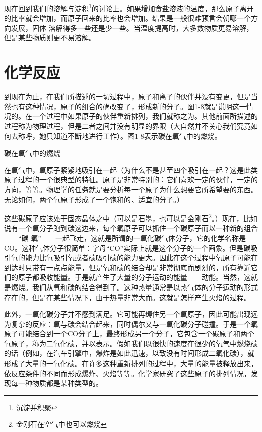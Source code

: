 \documentclass[12pt,oneside]{book}
\begin{document}
\begin{common-format}
现在回到我们的溶解与淀积\footnote{沉淀并积聚}的讨论上。如果增加食盐溶液的温度，那么原子离开的比率就会增加，而原子回来的比率也会增加。结果是一般很难预言会朝哪一个方向发展，固体
溶解得多一些还是少一些。当温度提高时，大多数物质更易溶解， 但是某些物质则更不易溶解。

\section{化学反应}
到现在为止，在我们所描述的一切过程中，原子和离子的伙伴并没有变更，但是当然也有这种情况，原子的组合的确改变了，形成新的分子。图1-8就是说明这一情况的。在一个过程中如果原子的伙伴重新排列，我们就称之为。其他前面所描述的过程称为物理过程，但是二者之间并没有明显的界限（大自然并不关心我们究竟如何去称呼，她只知道不断地进行工作）。图1-8表示碳在氧气中的燃烧。
\begin{fig}{碳在氧气中的燃烧}
\caption{碳在氧气中的燃烧}
\label{fig:碳在氧气中的燃烧}
\end{fig}
在氧气中，氧原子紧紧地吸引在一起（为什么不是甚至四个吸引在一起？这是此类原子过程的一个很典型的特征。原子是非常特别的：它们喜欢一定的伙伴，一定的方向，等等。物理学的任务就是要分析每一个原子为什么想要它所希望要的东西。无论如何，两个氧原子形成了一个饱和的、适宜的分子。）

这些碳原子应该处于固态晶体之中（可以是石墨，也可以是金刚石\footnote{金刚石在空气中也可以燃烧}。）现在，比如说有一个氧分子跑到碳这边来，每个氧原子可以抓住一个碳原子而以一种新的组合——“碳-氧”——一起飞走，这就是所谓的一氧化碳气体分子，它的化学名称是CO。这种气体分子很简单：字母“CO”实际上就是这个分子的一个画象。但是碳吸引氧的能力比氧吸引氧或者碳吸引碳的能力更大。因此在这个过程中氧原子可能在到达时只带有一点点能量，但是氧和碳的结合却是非常彻底而剧烈的，所有靠近它们的原子都吸收能量。于是就产生了大量的分子运动的能量——动能。当然，这就是燃烧。我们从氧和碳的结合得到了。这种热量通常是以热气体的分子运动的形式存在的，但是在某些情况下，由于热量非常大而。这就是怎样产生火焰的过程。

此外，一氧化碳分子并不感到满足。它可能再缚住另一个氧原子，因此可能出现远为复杂的反应：氧与碳会结合起来，同时偶尔又与一氧化碳分子碰撞。于是一个氧原子可能结合到一个CO分子上，最终形成另一个分子，它包含一个碳原子和两个氧原子，称为二氧化碳，并以表示。假如我们以很快的速度在很少的氧气中燃烧碳的话（例如，在汽车引擎中，爆炸是如此迅速，以致没有时间形成二氧化碳），就形成了大量的一氧化碳。在许多这种重新排列的过程中，大量的能量被释放出来，依反应条件的不同而形成爆炸、火焰等等。化学家研究了这些原子的排列情况，发现每一种物质都是某种类型的。


\end{common-format}
\end{document}
